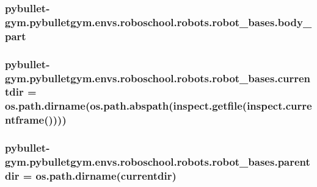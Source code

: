 \subsubsection[{\texorpdfstring{body\+\_\+part}{body_part}}]{\setlength{\rightskip}{0pt plus 5cm}pybullet-\/gym.\+pybulletgym.\+envs.\+roboschool.\+robots.\+robot\+\_\+bases.\+body\+\_\+part}\hypertarget{namespacepybullet-gym_1_1pybulletgym_1_1envs_1_1roboschool_1_1robots_1_1robot__bases_a0827d502bd373ee972203bce479a71f9}{}\label{namespacepybullet-gym_1_1pybulletgym_1_1envs_1_1roboschool_1_1robots_1_1robot__bases_a0827d502bd373ee972203bce479a71f9}
\subsubsection[{\texorpdfstring{currentdir}{currentdir}}]{\setlength{\rightskip}{0pt plus 5cm}pybullet-\/gym.\+pybulletgym.\+envs.\+roboschool.\+robots.\+robot\+\_\+bases.\+currentdir = os.\+path.\+dirname(os.\+path.\+abspath(inspect.\+getfile(inspect.\+currentframe())))}\hypertarget{namespacepybullet-gym_1_1pybulletgym_1_1envs_1_1roboschool_1_1robots_1_1robot__bases_a9b4eac4485470868e78db11f63db99e9}{}\label{namespacepybullet-gym_1_1pybulletgym_1_1envs_1_1roboschool_1_1robots_1_1robot__bases_a9b4eac4485470868e78db11f63db99e9}
\subsubsection[{\texorpdfstring{parentdir}{parentdir}}]{\setlength{\rightskip}{0pt plus 5cm}pybullet-\/gym.\+pybulletgym.\+envs.\+roboschool.\+robots.\+robot\+\_\+bases.\+parentdir = os.\+path.\+dirname({\bf currentdir})}\hypertarget{namespacepybullet-gym_1_1pybulletgym_1_1envs_1_1roboschool_1_1robots_1_1robot__bases_abe4ae4f51492ce02342ef77e29502d17}{}\label{namespacepybullet-gym_1_1pybulletgym_1_1envs_1_1roboschool_1_1robots_1_1robot__bases_abe4ae4f51492ce02342ef77e29502d17}
